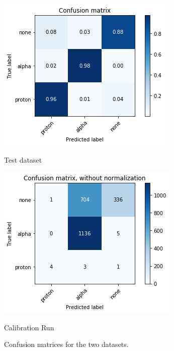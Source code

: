 \begin{figure}[htb]
  \centering
  \begin{minipage}[b]{0.45\textwidth}
    \includegraphics[width=\textwidth]{img/conf_test.png}
    \caption{Test dataset}
    \label{conf_test}
  \end{minipage}
  \hfill
  \begin{minipage}[b]{0.45\textwidth}
   \includegraphics[width=\textwidth]{img/conf_alphas.png}
  \caption{Calibration Run}
  \label{conf_alpha}
  \end{minipage}
  \caption{Confusion matrices for the two datasets.}
  \label{input:deep}
\end{figure}

